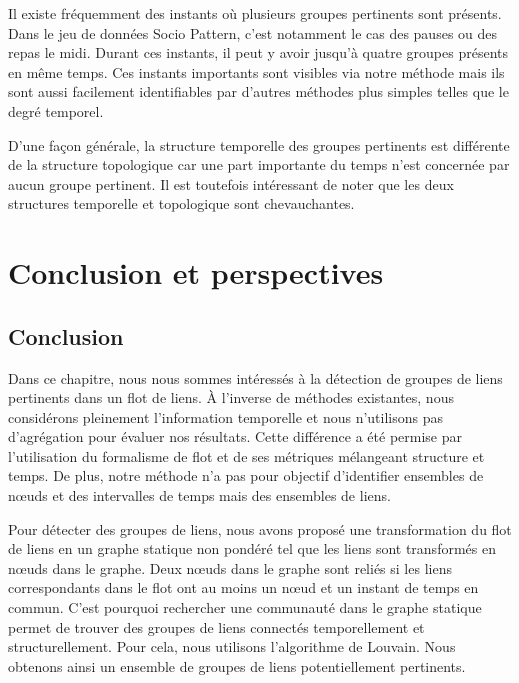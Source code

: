 Il existe fréquemment des instants où plusieurs groupes pertinents sont présents.
Dans le jeu de données Socio Pattern, c'est notamment le cas des pauses ou des repas le midi.
Durant ces instants, il peut y avoir jusqu'à quatre groupes présents en même temps.
Ces instants importants sont visibles via notre méthode mais ils sont aussi facilement identifiables par d'autres méthodes plus simples telles que le degré temporel.

D'une façon générale, la structure temporelle des groupes pertinents est différente de la structure topologique car une part importante du temps n'est concernée par aucun groupe pertinent.
Il est toutefois intéressant de noter que les deux structures temporelle et topologique sont chevauchantes. 



\section{Conclusion et perspectives}
\subsection{Conclusion}

Dans ce chapitre, nous nous sommes intéressés à la détection de groupes de liens pertinents dans un flot de liens.
\`A l'inverse de méthodes existantes, nous considérons pleinement l'information temporelle et nous n'utilisons pas d'agrégation pour évaluer nos résultats.
Cette différence a été permise par l'utilisation du formalisme de flot et de ses métriques mélangeant structure et temps.
De plus, notre méthode n'a pas pour objectif d'identifier ensembles de n\oe{}uds et des intervalles de temps mais des ensembles de liens.

Pour détecter des groupes de liens, nous avons proposé une transformation du flot de liens en un graphe statique non pondéré tel que les liens sont transformés en n\oe{}uds dans le graphe.
Deux n\oe{}uds dans le graphe sont reliés si les liens correspondants dans le flot ont au moins un n\oe{}ud et un instant de temps en commun.
C'est pourquoi rechercher une communauté dans le graphe statique permet de trouver des groupes de liens connectés temporellement et structurellement.
Pour cela, nous utilisons l'algorithme de Louvain.
Nous obtenons ainsi un ensemble de groupes de liens potentiellement pertinents.

